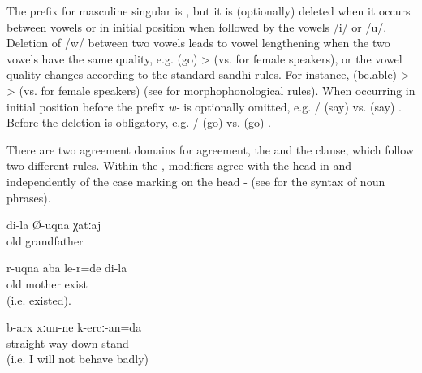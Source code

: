 The prefix for masculine singular is , but it is (optionally) deleted when it occurs between vowels or in initial position when followed by the vowels /i/ or /u/. Deletion of /w/ between two vowels leads to vowel lengthening when the two vowels have the same quality, e.g.  (go) >   (vs.  for female speakers), or the vowel quality changes according to the standard sandhi rules. For instance,  (be.able) >  >   (vs.  for female speakers) (see  for morphophonological rules). When occurring in initial position before  the prefix \textit{w-} is optionally omitted, e.g. \slash{} (say) vs.  (say) . Before  the deletion is obligatory, e.g. \slash{} (go) vs.  (go) .

There are two agreement domains for  agreement, the  and the clause, which follow two different rules. Within the , modifiers agree with the head in  and  independently of the case marking on the head -  (see  for the syntax of noun phrases).
%
\begin{exe}
	\ex	\label{ex:agreement number}
	\begin{xlist}
		\TabPositions{13em}
		\ex	{} 	\tab	{} 	\label{ex:agreement number@A}
		\ex	{} 	\tab	{} 	\label{ex:agreement number@B}
		\ex	{} 		\tab	{} 		\label{ex:agreement number@C}
	\end{xlist}

	\ex	\label{ex:my old grandfather agreement}
	\gll	di-la	Ø-uqna	χatːaj\\
			old	grandfather\\
	\glt	{}

	\ex	\label{ex:‎‎My old mother was alive agreement}
	\gll	r-uqna	aba	le-r=de	di-la\\
		old	mother	exist	\\
	\glt	{} (i.e. existed).

	\ex	\label{ex:I will be on the straight road agreement}
	\gll	b-arx	xːun-ne	k-ercː-an=da\\
		straight	way	down-stand\\
	\glt	{} (i.e. I will not behave badly)
\end{exe}

